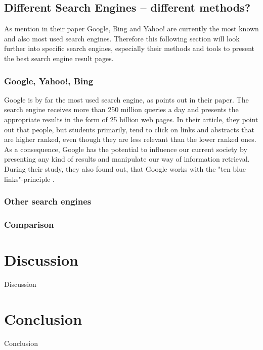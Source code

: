 \subsection{Different Search Engines -- different methods?}
\label{subsection:SearchEngine}
As \textcite{pan2007google, agrawal2015study} mention in their paper Google, Bing and Yahoo! are currently the most known and also most used search engines. Therefore this following section will look further into specific search engines, especially their methods and tools to present the best search engine result pages.

\subsubsection{Google, Yahoo!, Bing}
Google is by far the most used search engine, as \textcite{pan2007google} points out in their paper. The search engine receives more than 250 million queries a day and presents the appropriate results in the form of 25 billion web pages. In their article, they point out that people, but students primarily, tend to click on links and abstracts that are higher ranked, even though they are less relevant than the lower ranked ones. As a consequence, Google has the potential to influence our current society by presenting any kind of results and manipulate our way of information retrieval. During their study, they also found out, that Google works with the "ten blue links"-principle \autocite{pan2007google}.

\subsubsection{Other search engines}

\subsubsection{Comparison}

\section{Discussion}
\label{section:Discussion}
Discussion

\section{Conclusion}
\label{section:Conclusion}
Conclusion



